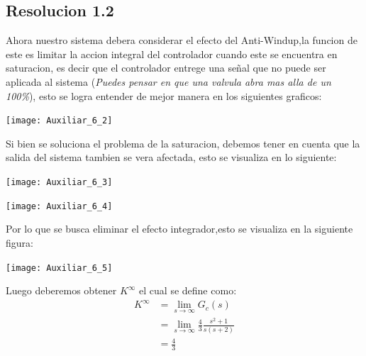\documentclass[
  11pt,
  letterpaper,
   addpoints,
   answers
  ]{exam}
\begin{document}
\begin{questions}
\begin{solution}
    \subsection*{Resolucion 1.2}
    Ahora nuestro sistema debera considerar el efecto del Anti-Windup,la funcion de este es limitar la accion integral del controlador cuando este se encuentra en saturacion, es decir que el controlador entrege una señal que no puede ser aplicada al sistema (\textit{Puedes pensar en que una valvula abra mas alla de un 100\%}), esto se logra entender de mejor manera en los siguientes graficos:
    \begin{center}
        \texttt{[image: Auxiliar\_6\_2]}
    \end{center}
    Si bien se soluciona el problema de la saturacion, debemos tener en cuenta que la salida del sistema tambien se vera afectada, esto se visualiza en lo siguiente:
    \begin{center}
        \texttt{[image: Auxiliar\_6\_3]}
    \end{center}
    \begin{center}
        \texttt{[image: Auxiliar\_6\_4]}
    \end{center}
    Por lo que se busca eliminar el efecto integrador,esto se visualiza en la siguiente figura:
    \begin{center}
        \texttt{[image: Auxiliar\_6\_5]}
    \end{center}
    Luego deberemos obtener $K^{\infty}$ el cual se define como:
    \begin{align}
        K^{\infty} &= \lim_{s\to \infty}G_{c}(s)\\
                   &= \lim_{s\to \infty} \frac{4}{3}\frac{s^{2}+1}{s(s+2)}\\
                   &= \frac{4}{3}
    \end{align}

\end{solution}
\end{questions}
\end{document}
